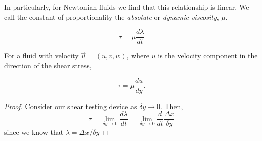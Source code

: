 In particularly, for Newtonian fluids we find that this relationship is linear. We call the constant of proportionality the \textit{absolute} or \textit{dynamic viscosity}, $\mu$.

\begin{equation} \label{eq:shear-stress-strain-in-liquids}
  \tau = \mu \frac{ d \lambda }{ d t }
\end{equation}

\begin{proposition}
  For a fluid with velocity $\vec{u} = (u,v,w)$, where $u$ is the velocity component in the direction of the shear stress,

  \begin{equation*}
    \tau = \mu \frac{ d u }{ d y }.
  \end{equation*}
\end{proposition}

\begin{proof}
  Consider our shear testing device as $\delta y \rightarrow 0$. Then,
  \begin{equation*}
    \tau = \lim_{\delta y \rightarrow 0} \frac{ d \lambda }{ dt } = \lim_{\delta y \rightarrow 0} \frac{ d }{ dt } \frac{ \Delta x }{ \delta y }
  \end{equation*}
  since we know that $\lambda = \Delta x / \delta y$
\end{proof}
